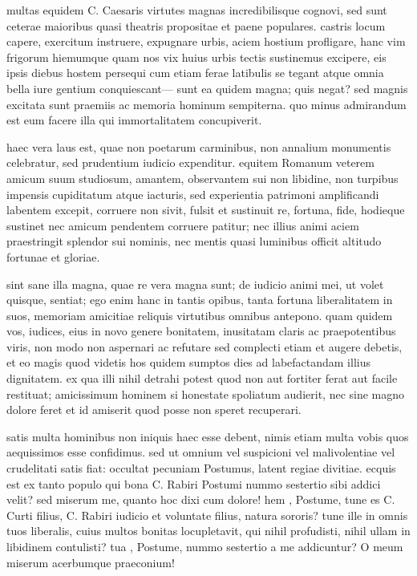  multas equidem C. Caesaris virtutes magnas incredibilisque cognovi, sed sunt ceterae maioribus quasi theatris propositae et paene populares. castris locum capere, exercitum instruere, expugnare urbis, aciem hostium profligare, hanc vim frigorum hiemumque quam nos vix huius urbis tectis sustinemus excipere, eis ipsis diebus hostem persequi cum etiam ferae latibulis se tegant atque omnia bella iure gentium conquiescant— sunt ea quidem magna; quis negat? sed magnis excitata sunt praemiis ac memoria hominum sempiterna. quo minus admirandum est eum facere illa qui immortalitatem concupiverit.

 haec vera laus est, quae non poetarum carminibus, non annalium monumentis celebratur, sed prudentium iudicio expenditur. equitem Romanum veterem amicum suum studiosum, amantem, observantem sui non libidine, non turpibus impensis cupiditatum atque iacturis, sed experientia patrimoni amplificandi labentem excepit, corruere non sivit, fulsit et sustinuit re, fortuna, fide, hodieque sustinet nec amicum pendentem corruere patitur; nec illius animi aciem praestringit splendor sui nominis, nec mentis quasi luminibus officit altitudo fortunae et gloriae.

 sint sane illa magna, quae re vera magna sunt; de iudicio animi mei, ut volet quisque, sentiat; ego enim hanc in tantis opibus, tanta fortuna liberalitatem in suos, memoriam amicitiae reliquis virtutibus omnibus antepono. quam quidem vos, iudices, eius in novo genere bonitatem, inusitatam claris ac praepotentibus viris, non modo non aspernari ac refutare sed complecti etiam et augere debetis, et eo magis quod videtis hos quidem sumptos dies ad labefactandam illius dignitatem. ex qua illi nihil detrahi potest quod non aut fortiter ferat aut facile restituat; amicissimum hominem si honestate spoliatum audierit, nec sine magno dolore feret et id amiserit quod posse non speret recuperari.

 satis multa hominibus non iniquis haec esse debent, nimis etiam multa vobis quos aequissimos esse confidimus. sed ut omnium vel suspicioni vel malivolentiae vel crudelitati satis fiat: occultat pecuniam Postumus, latent regiae divitiae. ecquis est ex tanto populo qui bona C. Rabiri Postumi nummo sestertio sibi addici velit? sed miserum me, quanto hoc dixi cum dolore! hem , Postume, tune es C. Curti filius, C. Rabiri iudicio et voluntate filius, natura sororis? tune ille in omnis tuos liberalis, cuius multos bonitas locupletavit, qui nihil profudisti, nihil ullam in libidinem contulisti? tua , Postume, nummo sestertio a me addicuntur? O meum miserum acerbumque praeconium!

